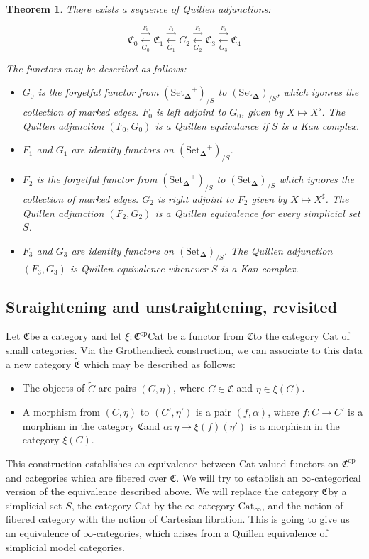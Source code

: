 \documentclass[12pt]{amsart}
\newcommand{\8}{\ensuremath{\infty}}
\newcommand{\C}{\ensuremath{\mathfrak{C}}}
\newcommand{\SSet}{\ensuremath{\text{Set}_{\boldsymbol{\Delta}}}}
\newcommand{\op}[1]{\ensuremath{{#1}^{\text{op}}}}
\newcommand{\adj}[2]{\ensuremath{\overset{\overset{#1}{ \rightarrow}}{\underset{#2}{\leftarrow}}}}
\newtheorem{theorem}{Theorem}
\begin{document}
{{\begin{theorem}
  There exists a sequence of Quillen adjunctions:

  $$
    \C_0 \adj{F_0}{G_0} \C_1 \adj{F_1}{G_1} C_2 \adj{F_2}{G_2} \C_3 \adj{F_3}{G_3} \C_4
  $$

  The functors may be described as follows:
  \begin{itemize}
    \item[(A0)] $G_0$ is the forgetful functor from $(\SSet^+)_{/S}$ to $(\SSet)_{/S}$, which igonres the collection of marked edges. $F_0$ is left adjoint to $G_0$, given by $X \mapsto X^\flat$. The Quillen adjunction $(F_0, G_0)$ is a Quillen equivalance if $S$ is a Kan complex.
    \item[(A1)] $F_1$ and $G_1$ are identity functors on $(\SSet^+)_{/S}$.
    \item[(A2)]  $F_2$ is the forgetful functor from $(\SSet^+)_{/S}$ to $(\SSet)_{/S}$ which ignores the collection of marked edges. $G_2$ is right adjoint to $F_2$ given by $X \mapsto X^\sharp$. The Quillen adjunction $(F_2, G_2)$ is a Quillen equivalence for every simplicial set $S$.
    \item[(A3)]  $F_3$ and $G_3$ are identity functors on $(\SSet)_{/S}$. The Quillen adjunction $(F_3, G_3)$ is Quillen equivalence whenever $S$ is a Kan complex.
  \end{itemize}
\end{theorem}

\subsection{Straightening and unstraightening, revisited}
Let \C be a category and let $\xi: \op\C\text{Cat}$ be a functor from \C to the category $\text{Cat}$ of small categories. Via the Grothendieck construction, we can associate to this data a new category $\tilde{\C}$ which may be described as follows:

\begin{itemize}
  \item The objects of $\tilde{C}$ are pairs $(C, \eta)$, where $C \in \C$ and $\eta \in \xi(C)$.
  \item A morphism from $(C, \eta)$ to $(C', \eta')$ is a pair $(f, \alpha)$, where $f: C \rightarrow C'$ is a morphism in the category \C and $\alpha: \eta \rightarrow \xi(f)(\eta')$ is a morphism in the category $\xi(C)$.
\end{itemize}

This construction establishes an equivalence between Cat-valued functors on $\op\C$ and categories which are fibered over $\C$. We will try to establish an \8-categorical version of the equivalence described above. We will replace the category \C by a simplicial set $S$, the category Cat by the \8-category $\text{Cat}_{\8}$, and the notion of fibered category with the notion of Cartesian fibration. This is going to give us an equivalence of \8-categories, which arises from a Quillen equivalence of simplicial model categories.

}}
\end{document}
